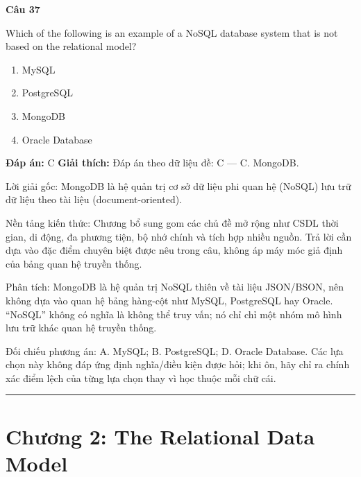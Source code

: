 \documentclass[11pt,a4paper]{article}
\newenvironment{question}[1]{%
  \par\vspace{1em}\noindent\textbf{\large Câu #1}\par\vspace{0.4em}
}{%
  \par\vspace{1em}\hrule\vspace{0.6em}
}
\newenvironment{choices}{%
  \begin{enumerate}[label=\textbf{\Alph*.},leftmargin=2.2em,itemsep=2pt,topsep=3pt]
}{%
  \end{enumerate}
}
\newcommand{\choice}{\item}
\begin{document}
\begin{question}{37}
Which of the following is an example of a NoSQL database system that is not based on the relational model?
\begin{choices}
\choice MySQL
\choice PostgreSQL
\choice MongoDB
\choice Oracle Database
\end{choices}
\textbf{Đáp án:} C
\textbf{Giải thích:} Đáp án theo dữ liệu đề: C — C. MongoDB.

Lời giải gốc: MongoDB là hệ quản trị cơ sở dữ liệu phi quan hệ (NoSQL) lưu trữ dữ liệu theo tài liệu (document-oriented).

Nền tảng kiến thức: Chương bổ sung gom các chủ đề mở rộng như CSDL thời gian, di động, đa phương tiện, bộ nhớ chính và tích hợp nhiều nguồn. Trả lời cần dựa vào đặc điểm chuyên biệt được nêu trong câu, không áp máy móc giả định của bảng quan hệ truyền thống.

Phân tích: MongoDB là hệ quản trị NoSQL thiên về tài liệu JSON/BSON, nên không dựa vào quan hệ bảng hàng-cột như MySQL, PostgreSQL hay Oracle. “NoSQL” không có nghĩa là không thể truy vấn; nó chỉ chỉ một nhóm mô hình lưu trữ khác quan hệ truyền thống.

Đối chiếu phương án: A. MySQL; B. PostgreSQL; D. Oracle Database. Các lựa chọn này không đáp ứng định nghĩa/điều kiện được hỏi; khi ôn, hãy chỉ ra chính xác điểm lệch của từng lựa chọn thay vì học thuộc mỗi chữ cái.
\end{question}


\newpage
\section*{Chương 2: The Relational Data Model}
\end{document}
